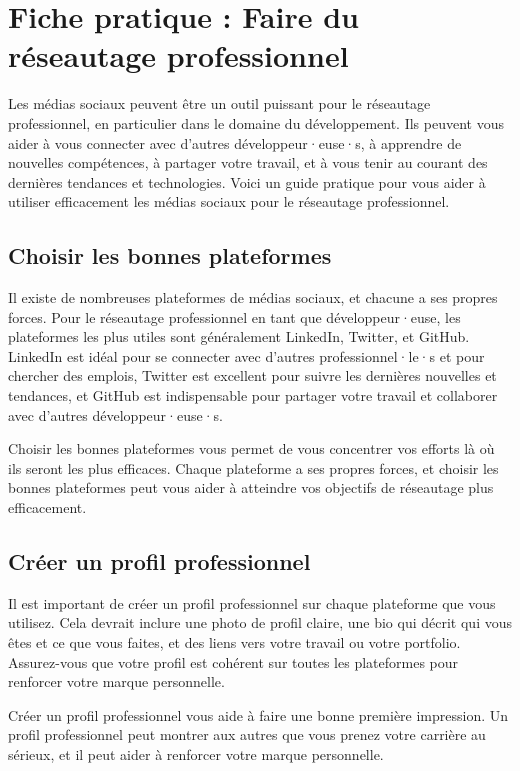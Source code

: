 \chapter{Fiche pratique : Faire du réseautage professionnel}

Les médias sociaux peuvent être un outil puissant pour le réseautage professionnel, en particulier dans le domaine du développement. Ils peuvent vous aider à vous connecter avec d'autres développeur·euse·s, à apprendre de nouvelles compétences, à partager votre travail, et à vous tenir au courant des dernières tendances et technologies. Voici un guide pratique pour vous aider à utiliser efficacement les médias sociaux pour le réseautage professionnel.

\section{Choisir les bonnes plateformes}

Il existe de nombreuses plateformes de médias sociaux, et chacune a ses propres forces. Pour le réseautage professionnel en tant que développeur·euse, les plateformes les plus utiles sont généralement LinkedIn, Twitter, et GitHub. LinkedIn est idéal pour se connecter avec d'autres professionnel·le·s et pour chercher des emplois, Twitter est excellent pour suivre les dernières nouvelles et tendances, et GitHub est indispensable pour partager votre travail et collaborer avec d'autres développeur·euse·s.

Choisir les bonnes plateformes vous permet de vous concentrer vos efforts là où ils seront les plus efficaces. Chaque plateforme a ses propres forces, et choisir les bonnes plateformes peut vous aider à atteindre vos objectifs de réseautage plus efficacement.

\section{Créer un profil professionnel}

Il est important de créer un profil professionnel sur chaque plateforme que vous utilisez. Cela devrait inclure une photo de profil claire, une bio qui décrit qui vous êtes et ce que vous faites, et des liens vers votre travail ou votre portfolio. Assurez-vous que votre profil est cohérent sur toutes les plateformes pour renforcer votre marque personnelle.

Créer un profil professionnel vous aide à faire une bonne première impression. Un profil professionnel peut montrer aux autres que vous prenez votre carrière au sérieux, et il peut aider à renforcer votre marque personnelle.


